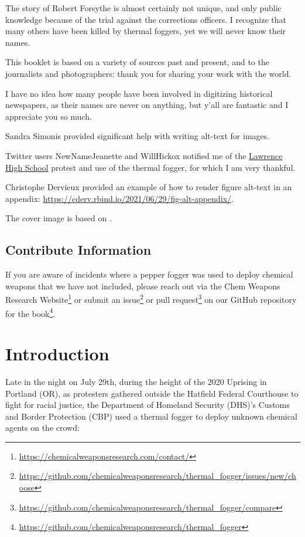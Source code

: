 \documentclass[
  11pt,
  titlepage]{krantz}
\renewcommand{\href}[2]{#2\footnote{\url{#1}}}
\begin{document}
The story of Robert Forsythe is almost certainly not unique, and only public knowledge because of the trial against the corrections officers.
I recognize that many others have been killed by thermal foggers, yet we will never know their names.

This booklet is based on a variety of sources past and present, and to the journalists and photographers: thank you for sharing your work with the world.

I have no idea how many people have been involved in digitizing historical newspapers, as their names are never on anything, but y'all are fantastic and I appreciate you so much.

Sandra Simonis provided significant help with writing alt-text for images.

Twitter users NewNameJeanette and WillHickox notified me of the \protect\hyperlink{Lawrence1970_04_21}{Lawrence High School} protest and use of the thermal fogger, for which I am very thankful.

Christophe Dervieux provided an example of how to render figure alt-text in an appendix: \url{https://cderv.rbind.io/2021/06/29/fig-alt-appendix/}.

The cover image is based on \citet{Lewis-Rolland2021a}.

\hypertarget{contribute-information}{%
\section*{Contribute Information}\label{contribute-information}}


If you are aware of incidents where a pepper fogger was used to deploy chemical weapons that we have not included, please reach out \href{https://chemicalweaponsresearch.com/contact/}{via the Chem Weapons Research Website} or submit an \href{https://github.com/chemicalweaponsresearch/thermal_fogger/issues/new/choose}{issue} or \href{https://github.com/chemicalweaponsresearch/thermal_fogger/compare}{pull request} on our \href{https://github.com/chemicalweaponsresearch/thermal_fogger}{GitHub repository for the book}.

\mainmatter

\hypertarget{introduction}{%
\chapter*{Introduction}\label{introduction}}


Late in the night on July 29th, during the height of the 2020 Uprising in Portland (OR), as protesters gathered outside the Hatfield Federal Courthouse to fight for racial justice, the Department of Homeland Security (DHS)'s Customs and Border Protection (CBP) used a thermal fogger to deploy unknown chemical agents on the crowd:
\end{document}
